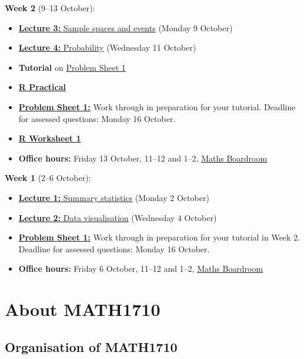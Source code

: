 \documentclass[
  a4paper,
]{book}
\providecommand{\tightlist}{%
  \setlength{\itemsep}{0pt}\setlength{\parskip}{0pt}}
\theoremstyle{definition}
\theoremstyle{definition}
\theoremstyle{definition}
\theoremstyle{definition}
\theoremstyle{remark}
\begin{document}
\textbf{Week 2} (9--13 October):

\begin{itemize}
\tightlist
\item
  \protect\hyperlink{L03-events}{\textbf{Lecture 3:} Sample spaces and events} (Monday 9 October)
\item
  \protect\hyperlink{L04-probability}{\textbf{Lecture 4:} Probability} (Wednesday 11 October)
\item
  \textbf{Tutorial} on \protect\hyperlink{P1}{Problem Sheet 1}
\item
  \protect\hyperlink{practical}{\textbf{R Practical}}
\item
  \protect\hyperlink{P1}{\textbf{Problem Sheet 1:}} Work through in preparation for your tutorial. Deadline for assessed questions: Monday 16 October.
\item
  \protect\hyperlink{R}{\textbf{R Worksheet 1}}
\item
  \textbf{Office hours:} Friday 13 October, 11--12 and 1--2, \href{boardroom.png}{Maths Boardroom}
\end{itemize}

\textbf{Week 1} (2--6 October):

\begin{itemize}
\tightlist
\item
  \protect\hyperlink{L01-stats}{\textbf{Lecture 1:} Summary statistics} (Monday 2 October)
\item
  \protect\hyperlink{L02-dataviz}{\textbf{Lecture 2:} Data visualisation} (Wednesday 4 October)
\item
  \protect\hyperlink{P1}{\textbf{Problem Sheet 1:}} Work through in preparation for your tutorial in Week 2. Deadline for assessed questions: Monday 16 October.
\item
  \textbf{Office hours:} Friday 6 October, 11--12 and 1--2, \href{boardroom.png}{Maths Boardroom}
\end{itemize}

\hypertarget{about}{%
\chapter*{About MATH1710}\label{about}}

\hypertarget{organisation}{%
\section*{Organisation of MATH1710}\label{organisation}}
\end{document}
